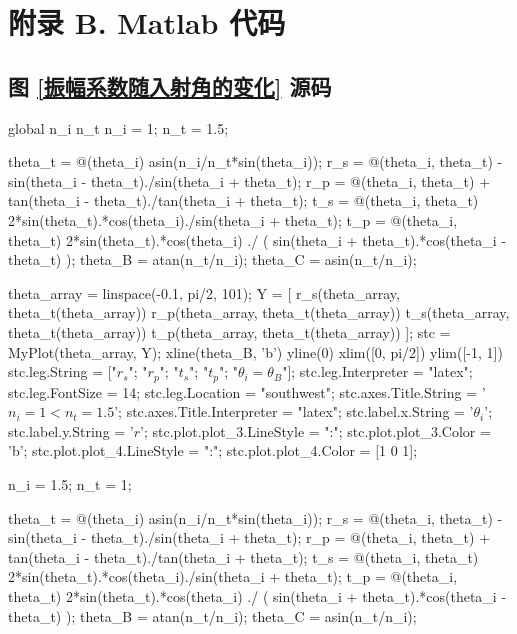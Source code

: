 \documentclass[UTF8]{report}
\theoremstyle{MyLineTheoremStyle} %
\theoremstyle{MyBlockTheoremStyle} %
\theoremstyle{MySubsubsectionStyle} %
\begin{document}
\chapter*{附录 B. Matlab 代码}   
\thispagestyle{fancy} 
\setcounter{section}{0}   
\renewcommand\thesection{B.\arabic{section}}   
\renewcommand{\thefigure}{B.\arabic{figure}} 
\renewcommand{\thetable}{B.\arabic{table}}

\section{图 \ref{振幅系数随入射角的变化} 源码}
\begin{matlablisting}
global n_i n_t
n_i = 1;
n_t = 1.5;

theta_t = @(theta_i) asin(n_i/n_t*sin(theta_i));
r_s = @(theta_i, theta_t) - sin(theta_i - theta_t)./sin(theta_i + theta_t);
r_p = @(theta_i, theta_t) + tan(theta_i - theta_t)./tan(theta_i + theta_t);
t_s = @(theta_i, theta_t) 2*sin(theta_t).*cos(theta_i)./sin(theta_i + theta_t);
t_p = @(theta_i, theta_t) 2*sin(theta_t).*cos(theta_i) ./ ( sin(theta_i + theta_t).*cos(theta_i - theta_t) );
theta_B = atan(n_t/n_i);
theta_C = asin(n_t/n_i);

theta_array = linspace(-0.1, pi/2, 101);
Y = [
    r_s(theta_array, theta_t(theta_array))
    r_p(theta_array, theta_t(theta_array))
    t_s(theta_array, theta_t(theta_array))
    t_p(theta_array, theta_t(theta_array))
    ];
stc = MyPlot(theta_array, Y);
xline(theta_B, 'b')
yline(0)
xlim([0, pi/2])
ylim([-1, 1])
stc.leg.String = ["$r_s$"; "$r_p$"; "$t_s$"; "$t_p$"; "$\theta_i = \theta_B$"];
stc.leg.Interpreter = "latex";
stc.leg.FontSize = 14;
stc.leg.Location = "southwest";
stc.axes.Title.String = '$n_i = 1 < n_t = 1.5$';
stc.axes.Title.Interpreter = "latex";
stc.label.x.String = '$\theta_i$';
stc.label.y.String = '$r$';
stc.plot.plot_3.LineStyle = ":";
stc.plot.plot_3.Color = 'b';
stc.plot.plot_4.LineStyle = ":";
stc.plot.plot_4.Color = [1 0 1];

n_i = 1.5;
n_t = 1;

theta_t = @(theta_i) asin(n_i/n_t*sin(theta_i));
r_s = @(theta_i, theta_t) - sin(theta_i - theta_t)./sin(theta_i + theta_t);
r_p = @(theta_i, theta_t) + tan(theta_i - theta_t)./tan(theta_i + theta_t);
t_s = @(theta_i, theta_t) 2*sin(theta_t).*cos(theta_i)./sin(theta_i + theta_t);
t_p = @(theta_i, theta_t) 2*sin(theta_t).*cos(theta_i) ./ ( sin(theta_i + theta_t).*cos(theta_i - theta_t) );
theta_B = atan(n_t/n_i);
theta_C = asin(n_t/n_i);



\end{matlablisting}
\end{document}
